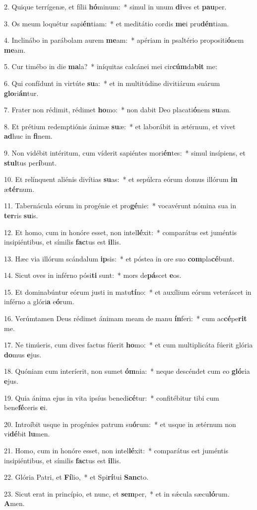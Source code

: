 2. Quique terrígenæ, et fílii \textbf{hó}minum:~*  simul in unum \textbf{di}ves et \textbf{pau}per.\

3. Os meum loquétur sapi\textbf{én}tiam:~*  et meditátio cordis \textbf{me}i pru\textbf{dén}tiam.\

4. Inclinábo in parábolam aurem \textbf{me}am:~*  apériam in psaltério propositi\textbf{ó}nem \textbf{me}am.\

5. Cur timébo in die \textbf{ma}la?~*  iníquitas calcánei mei cir\textbf{cúm}da\textbf{bit} me:\

6. Qui confídunt in virtúte \textbf{su}a:~*  et in multitúdine divitiárum suárum \textbf{glo}ri\textbf{án}tur.\

7. Frater non rédimit, rédimet \textbf{ho}mo:~*  non dabit Deo placati\textbf{ó}nem \textbf{su}am.\

8. Et prétium redemptiónis ánimæ \textbf{su}æ:~*  et laborábit in ætérnum, et vivet \textbf{ad}huc in \textbf{fi}nem.\

9. Non vidébit intéritum, cum víderit sapiéntes mori\textbf{én}tes:~*  simul insípiens, et \textbf{stul}tus per\textbf{í}bunt.\

10. Et relínquent aliénis divítias \textbf{su}as:~*  et sepúlcra eórum domus illórum \textbf{in} æ\textbf{tér}num.\

11. Tabernácula eórum in progénie et pro\textbf{gé}nie:~*  vocavérunt nómina sua in \textbf{ter}ris \textbf{su}is.\

12. Et homo, cum in honóre esset, non intel\textbf{lé}xit:~*  comparátus est juméntis insipiéntibus, et símilis \textbf{fac}tus est \textbf{il}lis.\

13. Hæc via illórum scándalum \textbf{ip}sis:~*  et póstea in ore suo \textbf{com}pla\textbf{cé}bunt.\

14. Sicut oves in inférno pósi\textbf{ti} sunt:~*  mors de\textbf{pá}scet \textbf{e}os.\

15. Et dominabúntur eórum justi in matu\textbf{tí}no:~*  et auxílium eórum veteráscet in inférno a glóri\textbf{a} e\textbf{ó}rum.\

16. Verúmtamen Deus rédimet ánimam meam de manu \textbf{ín}feri:~*  cum ac\textbf{cé}pe\textbf{rit} me.\

17. Ne timúeris, cum dives factus fúerit \textbf{ho}mo:~*  et cum multiplicáta fúerit glória \textbf{do}mus \textbf{e}jus.\

18. Quóniam cum interíerit, non sumet \textbf{óm}nia:~*  neque descéndet cum eo \textbf{gló}ria \textbf{e}jus.\

19. Quia ánima ejus in vita ipsíus benedi\textbf{cé}tur:~*  confitébitur tibi cum bene\textbf{fé}ceris \textbf{e}i.\

20. Introíbit usque in progénies patrum su\textbf{ó}rum:~*  et usque in ætérnum non vi\textbf{dé}bit \textbf{lu}men.\

21. Homo, cum in honóre esset, non intel\textbf{lé}xit:~*  comparátus est juméntis insipiéntibus, et símilis \textbf{fac}tus est \textbf{il}lis.\

22. Glória Patri, et \textbf{Fí}lio,~*  et Spi\textbf{rí}tui \textbf{Sanc}to.\

23. Sicut erat in princípio, et nunc, et \textbf{sem}per,~*  et in sǽcula sæcu\textbf{ló}rum. \textbf{A}men.\

